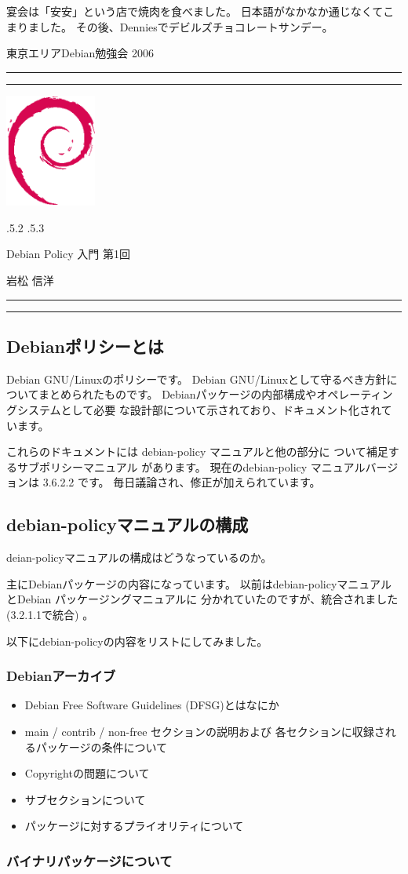 \documentclass[mingoth,a4paper]{jsarticle}
\makeatletter
\renewcommand{\section}{\@startsection{section}{1}{\z@}%
    {\Cvs \@plus.5\Cdp \@minus.2\Cdp}%
    {.5\Cvs \@plus.3\Cdp}%
    {\normalfont\Large\headfont\raggedright\centering}} %
\newcommand{\dancersection}[2]{%
\newpage
東京エリアDebian勉強会 2006
\hrule
\vspace{0.5mm}
\hrule
\hfill{}\includegraphics[width=3cm]{image200502/openlogo-nd.eps}\\
\vspace{-4cm}
\begin{center}
  \section{#1}
\end{center}
\hfill{}#2\hspace{3cm}\space\\
\hrule
\hrule
\vspace{1cm}
}
\makeatother
\begin{document}
	  
	    宴会は「安安」という店で焼肉を食べました。
	    日本語がなかなか通じなくてこまりました。
	    その後、Denniesでデビルズチョコレートサンデー。


\dancersection{Debian Policy 入門 第1回}{岩松 信洋}

\subsection{Debianポリシーとは}
    Debian GNU/Linuxのポリシーです。
    Debian GNU/Linuxとして守るべき方針についてまとめられたものです。
    Debianパッケージの内部構成やオペレーティングシステムとして必要
    な設計部について示されており、ドキュメント化されています。

    これらのドキュメントには debian-policy マニュアルと他の部分に
    ついて補足するサブポリシーマニュアル があります。
    現在のdebian-policy マニュアルバージョンは 3.6.2.2 です。
    毎日議論され、修正が加えられています。


\subsection{debian-policyマニュアルの構成}
    deian-policyマニュアルの構成はどうなっているのか。

    主にDebianパッケージの内容になっています。
    以前はdebian-policyマニュアルとDebian パッケージングマニュアルに
    分かれていたのですが、統合されました (3.2.1.1で統合) 。

    以下にdebian-policyの内容をリストにしてみました。

    \subsubsection{Debianアーカイブ}
\begin{itemize}
        \item Debian Free Software Guidelines (DFSG)とはなにか
        \item main / contrib / non-free セクションの説明および
          各セクションに収録されるパッケージの条件について
        \item Copyrightの問題について
        \item サブセクションについて
        \item パッケージに対するプライオリティについて
\end{itemize}
    \subsubsection{バイナリパッケージについて}
\end{document}

